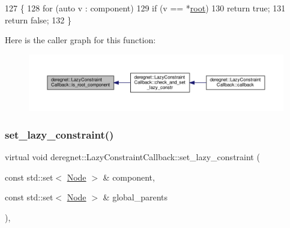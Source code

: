 \begin{DoxyCode}
127                                                                             \{
128     \textcolor{keywordflow}{for} (\textcolor{keyword}{auto} v : component)
129         \textcolor{keywordflow}{if} (v == *\hyperlink{classderegnet_1_1LazyConstraintCallback_aa4df18debaaf3aaace54a48b0c3e56ca}{root})
130             \textcolor{keywordflow}{return} \textcolor{keyword}{true};
131     \textcolor{keywordflow}{return} \textcolor{keyword}{false};
132 \}
\end{DoxyCode}
Here is the caller graph for this function\+:\nopagebreak
\begin{figure}[H]
\begin{center}
\leavevmode
\includegraphics[width=350pt]{classderegnet_1_1LazyConstraintCallback_a3eb6c682c8e1129036f1218513d6feb0_icgraph}
\end{center}
\end{figure}
\mbox{\label{classderegnet_1_1LazyConstraintCallback_a8f6db7da84271afcd2e2169318569558}} 
\subsubsection{\texorpdfstring{set\+\_\+lazy\+\_\+constraint()}{set\_lazy\_constraint()}}
{\footnotesize\ttfamily virtual void deregnet\+::\+Lazy\+Constraint\+Callback\+::set\+\_\+lazy\+\_\+constraint (\begin{DoxyParamCaption}\item[{const std\+::set$<$ \hyperlink{namespacederegnet_a744bad34f2de9856d36715a445f027f3}{Node} $>$ \&}]{component,  }\item[{const std\+::set$<$ \hyperlink{namespacederegnet_a744bad34f2de9856d36715a445f027f3}{Node} $>$ \&}]{global\+\_\+parents }\end{DoxyParamCaption})\hspace{0.3cm}{\ttfamily [private]}, {}}



